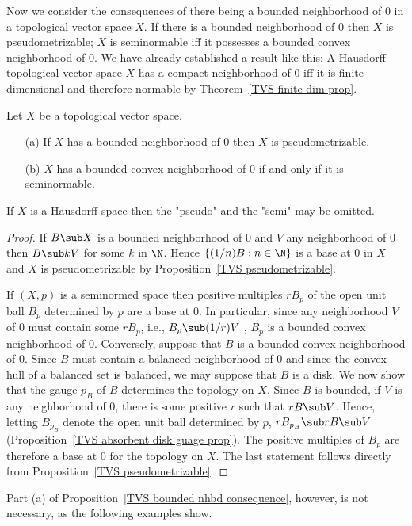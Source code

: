 Now we consider the consequences of there being a bounded neighborhood of $0$ in a topological vector space $X$. If there is a bounded neighborhood of $0$ then $X$ is pseudometrizable; $X$ is seminormable iff it possesses a bounded convex neighborhood of $0$. We have already established a result like this: A Hausdorff topological vector space $X$ has a compact neighborhood of $0$ iff it is finite-dimensional and therefore normable by Theorem~\ref{TVS finite dim prop}.
\begin{proposition}\label{TVS bounded nhbd consequence}
Let $X$ be a topological vector space.
\begin{itemize}
\item[(a)] If $X$ has a bounded neighborhood of $0$ then $X$ is pseudometrizable.
\item[(b)] $X$ has a bounded convex neighborhood of $0$ if and only if it is seminormable.
\end{itemize}
If $X$ is a Hausdorff space then the "pseudo" and the "semi" may be omitted.
\end{proposition}
\begin{proof}
If $B\sub X$ is a bounded neighborhood of $0$ and $V$ any neighborhood of $0$ then $B\sub kV$ for some $k$ in $\N$. Hence $\{(1/n)B:n\in\N\}$ is a base at $0$ in $X$ and $X$ is pseudometrizable by Proposition~\ref{TVS pseudometrizable}.\par
If $(X,p)$ is a seminormed space then positive multiples $rB_p$ of the open unit ball $B_p$ determined by $p$ are a base at $0$. In particular, since any neighborhood $V$ of $0$ must contain some $rB_p$, i.e., $B_p\sub(1/r)V$ , $B_p$ is a bounded convex neighborhood of $0$. Conversely, suppose that $B$ is a bounded convex neighborhood of $0$. Since $B$ must contain a balanced neighborhood of $0$ and since the convex hull of a balanced set is balanced, we may suppose that $B$ is a disk. We now show that the gauge $p_B$ of $B$ determines the topology on $X$. Since $B$ is bounded, if $V$ is any neighborhood of $0$, there is some positive $r$ such that $rB\sub V$. Hence, letting $B_{p_B}$ denote the open unit ball determined by $p$, $rB_{p_B}\sub rB\sub V$ (Proposition~\ref{TVS absorbent disk guage prop}). The positive multiples of $B_p$ are therefore a base at $0$ for the topology on $X$. The last statement follows directly from Proposition~\ref{TVS pseudometrizable}.
\end{proof}
Part (a) of Proposition~\ref{TVS bounded nhbd consequence}, however, is not necessary, as the following examples show.
